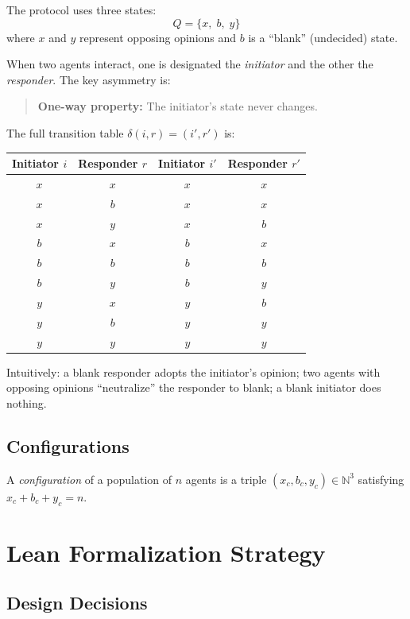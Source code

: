 \documentclass[11pt,a4paper]{article}
\begin{document}
The protocol uses three states:
\[
  Q = \{ x,\; b,\; y \}
\]
where $x$ and $y$ represent opposing opinions and $b$ is a ``blank''
(undecided) state.

When two agents interact, one is designated the \emph{initiator} and the
other the \emph{responder}.  The key asymmetry is:
\begin{quote}
\textbf{One-way property:} The initiator's state never changes.
\end{quote}

The full transition table $\delta(i, r) = (i', r')$ is:

\begin{center}
\begin{tabular}{cc|cc}
\toprule
Initiator $i$ & Responder $r$ & Initiator $i'$ & Responder $r'$ \\
\midrule
$x$ & $x$ & $x$ & $x$ \\
$x$ & $b$ & $x$ & $x$ \\
$x$ & $y$ & $x$ & $b$ \\
$b$ & $x$ & $b$ & $x$ \\
$b$ & $b$ & $b$ & $b$ \\
$b$ & $y$ & $b$ & $y$ \\
$y$ & $x$ & $y$ & $b$ \\
$y$ & $b$ & $y$ & $y$ \\
$y$ & $y$ & $y$ & $y$ \\
\bottomrule
\end{tabular}
\end{center}

Intuitively: a blank responder adopts the initiator's opinion; two agents with
opposing opinions ``neutralize'' the responder to blank; a blank initiator
does nothing.

\subsection{Configurations}

A \emph{configuration} of a population of $n$ agents is a triple
$(x_c, b_c, y_c) \in \mathbb{N}^3$ satisfying $x_c + b_c + y_c = n$.

\section{Lean Formalization Strategy}
\label{sec:strategy}

\subsection{Design Decisions}
\end{document}
